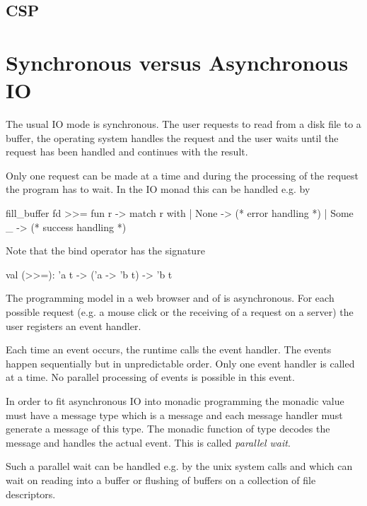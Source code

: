 \subsection{CSP}













\section{Synchronous versus Asynchronous IO}

The usual IO mode is synchronous. The user requests to read from a disk file
to a buffer, the operating system handles the request and the user waits
until the request has been handled and continues with the result.

Only one request can be made at a time and during the processing of the
request the program has to wait. In the IO monad this can be handled e.g. by
%
\begin{ocaml}
  fill_buffer fd >>= fun r ->
  match r with
  | None ->
    (* error handling *)
  | Some _ ->
    (* success handling *)
\end{ocaml}
%
Note that the bind operator has the signature
%
\begin{ocaml}
  val (>>=): 'a t -> ('a -> 'b t) -> 'b t
\end{ocaml}


The programming model in a web browser and of  is
asynchronous. For each possible request (e.g. a mouse click or the receiving
of a request on a server) the user registers an event handler.

Each time an event occurs, the runtime calls the event handler. The events
happen sequentially but in unpredictable order. Only one event handler is
called at a time. No parallel processing of events is possible in this event.

In order to fit asynchronous IO into monadic programming the monadic value
 must have a message type  which is a message and each
message handler must generate a message of this type. The monadic function of
type  decodes the message and handles the actual event. This
is called \emph{parallel wait}.

Such a parallel wait can be handled e.g. by the unix system calls
 and  which can wait on reading into a buffer or
flushing of buffers on a collection of file descriptors.

